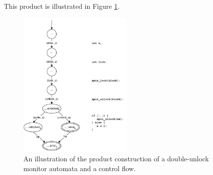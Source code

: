 \noindent This product is illustrated in Figure \ref{cfg_unlock-product}. 

\begin{figure}[H]
    \centering
    \includegraphics[width=0.5\textwidth]{background/figures/cfg_unlock-product}
    \caption{An illustration of the product construction of a double-unlock monitor automata and a control flow.}
    \label{cfg_unlock-product}
\end{figure}